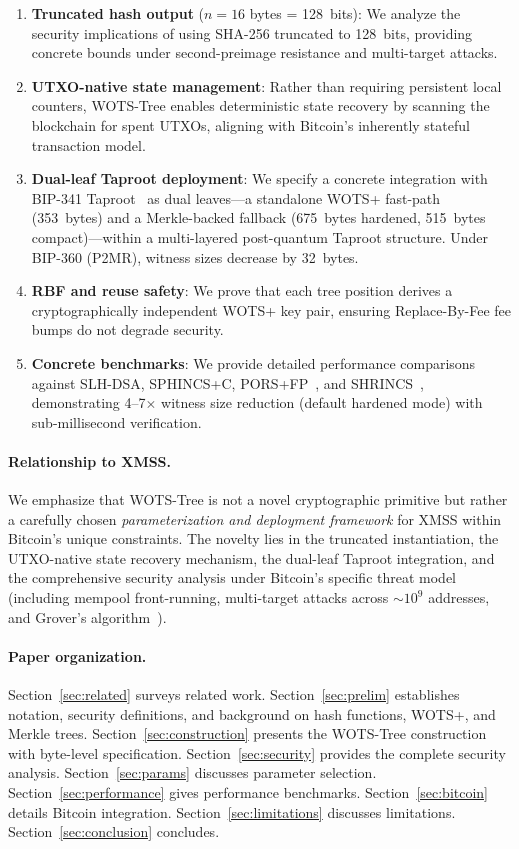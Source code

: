 \documentclass[11pt,a4paper]{article}
\theoremstyle{definition}
\begin{document}
\begin{enumerate}[nosep]
    \item \textbf{Truncated hash output} ($n=16$ bytes = 128~bits): We analyze the security implications of using SHA-256 truncated to 128~bits, providing concrete bounds under second-preimage resistance and multi-target attacks.
    \item \textbf{UTXO-native state management}: Rather than requiring persistent local counters, WOTS-Tree enables deterministic state recovery by scanning the blockchain for spent UTXOs, aligning with Bitcoin's inherently stateful transaction model.
    \item \textbf{Dual-leaf Taproot deployment}: We specify a concrete integration with BIP-341 Taproot~\cite{bip341} as dual leaves---a standalone WOTS+ fast-path (353~bytes) and a Merkle-backed fallback (675~bytes hardened, 515~bytes compact)---within a multi-layered post-quantum Taproot structure. Under BIP-360 (P2MR), witness sizes decrease by 32~bytes.
    \item \textbf{RBF and reuse safety}: We prove that each tree position derives a cryptographically independent WOTS+ key pair, ensuring Replace-By-Fee fee bumps do not degrade security.
    \item \textbf{Concrete benchmarks}: We provide detailed performance comparisons against SLH-DSA, SPHINCS+C, PORS+FP~\cite{kudinov2025}, and SHRINCS~\cite{nick2025shrincs}, demonstrating 4--7$\times$ witness size reduction (default hardened mode) with sub-millisecond verification.
\end{enumerate}

\paragraph{Relationship to XMSS.} We emphasize that WOTS-Tree is not a novel cryptographic primitive but rather a carefully chosen \emph{parameterization and deployment framework} for XMSS within Bitcoin's unique constraints. The novelty lies in the truncated instantiation, the UTXO-native state recovery mechanism, the dual-leaf Taproot integration, and the comprehensive security analysis under Bitcoin's specific threat model (including mempool front-running, multi-target attacks across $\sim 10^9$ addresses, and Grover's algorithm~\cite{grover1996fast}).

\paragraph{Paper organization.} Section~\ref{sec:related} surveys related work. Section~\ref{sec:prelim} establishes notation, security definitions, and background on hash functions, WOTS+, and Merkle trees. Section~\ref{sec:construction} presents the WOTS-Tree construction with byte-level specification. Section~\ref{sec:security} provides the complete security analysis. Section~\ref{sec:params} discusses parameter selection. Section~\ref{sec:performance} gives performance benchmarks. Section~\ref{sec:bitcoin} details Bitcoin integration. Section~\ref{sec:limitations} discusses limitations. Section~\ref{sec:conclusion} concludes.
\end{document}
